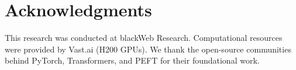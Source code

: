 \documentclass[11pt,a4paper]{article}
\begin{document}
\section*{Acknowledgments}

This research was conducted at blackWeb Research. Computational resources were provided by Vast.ai (H200 GPUs). We thank the open-source communities behind PyTorch, Transformers, and PEFT for their foundational work.


\end{document}
